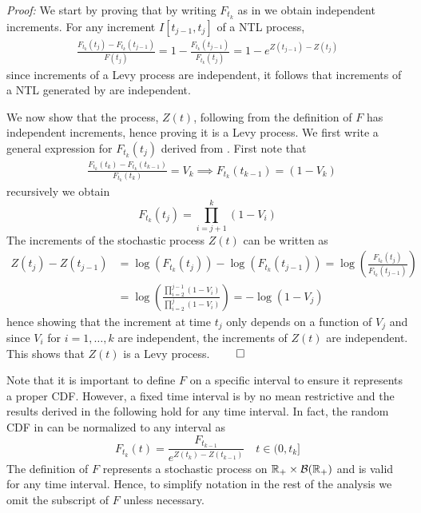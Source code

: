 \textit{Proof:} We start by proving that by writing $F_{t_k}$ as in  we obtain independent increments. For any increment $I[t_{j-1}, t_j]$ of a NTL process,
\begin{equation}\label{jump_equation}
\begin{split}
\frac{F_{t_k}(t_j) - F_{t_k}(t_{j-1})}{F(t_j)} = 1 - \frac{F_{t_k}(t_{j-1})}{F_{t_k}(t_j)} = 1 - e^{Z(t_{j-1}) -Z(t_j)}
\end{split}
\end{equation}
since increments of a Levy process are independent, it follows that increments of a NTL generated by  are independent. 

We now show that the process, $Z(t)$, following from the definition of $F$ has independent increments, hence proving it is a Levy process. We first write a general expression for $F_{t_k}(t_j)$ derived from . First note that
\begin{equation*}
\begin{split}
&\frac{F_{t_k}(t_k) - F_{t_k}(t_{k-1})}{F_{t_k}(t_{k})} = V_k \implies F_{t_k}(t_{k-1}) = (1-V_k)
\end{split}
\end{equation*} 
recursively we obtain
\begin{equation}\label{NTL_F}
F_{t_k}(t_j) = \prod_{i=j+1}^k (1 - V_i)
\end{equation}
The increments of the stochastic process $Z(t)$ can be written as 
\begin{equation*}
\begin{split}
Z(t_j) - Z(t_{j-1}) &= \log(F_{t_k}(t_j)) - \log(F_{t_k}(t_{j-1}))  = \log\left(\frac{F_{t_k}(t_{j})}{F_{t_k}(t_{j-1})}\right) \\ &= \log\left(\frac{\prod_{i=2}^{j-1} (1 - V_i)}{\prod_{i=2}^{j} (1 - V_i)}\right) = -\log(1 - V_j)
\end{split}
\end{equation*}
hence showing that the increment at time $t_j$ only depends on a function of $V_j$ and since $V_i$ for $i=1, \ldots, k$ are independent, the increments of $Z(t)$ are independent. This shows that $Z(t)$ is a Levy process. $\qed$

Note that it is important to define $F$ on a specific interval to ensure it represents a proper CDF. However, a fixed time interval is by no mean restrictive and the results derived in the following hold for any time interval. In fact, the random CDF in  can be normalized to any interval as
\begin{equation*}
F_{t_k}(t) = \frac{F_{t_{k-1}}}{e^{Z(t_k) - Z(t_{k-1})}} \quad t \in (0, t_k]
\end{equation*}
The definition of $F$ represents a stochastic process on $\mathbb{R}_{+} \times \mathcal{B}(\mathbb{R}_{+})$ and is valid for any time interval. Hence, to simplify notation in the rest of the analysis we omit the subscript of $F$ unless necessary.

